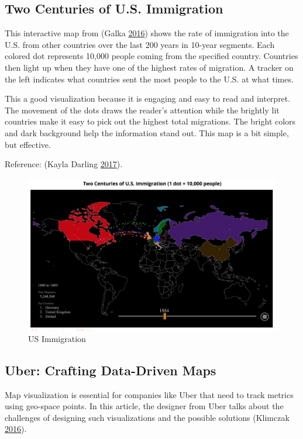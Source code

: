 \documentclass[]{book}
\theoremstyle{definition}
\theoremstyle{definition}
\theoremstyle{definition}
\theoremstyle{remark}
\begin{document}
\subsection{Two Centuries of U.S.
Immigration}\label{two-centuries-of-u.s.-immigration}

This interactive map from (Galka
\protect\hyperlink{ref-immigration}{2016}) shows the rate of immigration
into the U.S. from other countries over the last 200 years in 10-year
segments. Each colored dot represents 10,000 people coming from the
specified country. Countries then light up when they have one of the
highest rates of migration. A tracker on the left indicates what
countries sent the most people to the U.S. at what times.

This a good visualization because it is engaging and easy to read and
interpret. The movement of the dots draws the reader's attention while
the brightly lit countries make it easy to pick out the highest total
migrations. The bright colors and dark background help the information
stand out. This map is a bit simple, but effective.

Reference: (Kayla Darling \protect\hyperlink{ref-cool_data}{2017}).

\begin{figure}
\centering
\includegraphics{images/immigration.png}
\caption{US Immigration}
\end{figure}

\subsection{Uber: Crafting Data-Driven
Maps}\label{uber-crafting-data-driven-maps}

Map visualization is essential for companies like Uber that need to
track metrics using geo-space points. In this article, the designer from
Uber talks about the challenges of designing such visualizations and the
possible solutions (Klimczak \protect\hyperlink{ref-uber_maps}{2016}).
\end{document}
